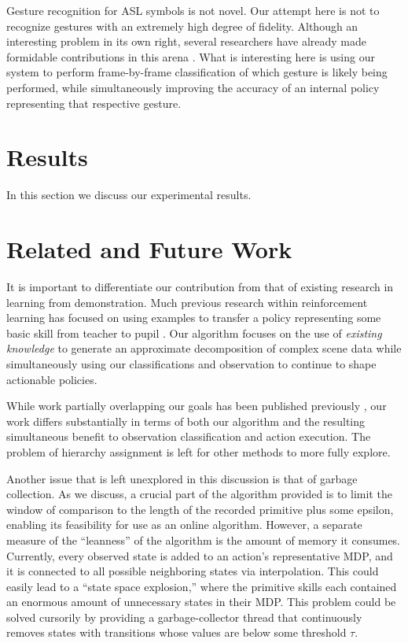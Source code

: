 \documentclass[letterpaper]{article}
\begin{document}
Gesture recognition for ASL symbols is not novel.  Our attempt here is not to recognize gestures with an extremely high degree of fidelity.  Although an interesting problem in its own right, several researchers have already made formidable contributions in this arena \cite{HandGestures,HSMMRecognition,POMDPGesture,HoughASL,ASLRealTime,MotionASL}.  What is interesting here is using our system to perform frame-by-frame classification of which gesture is likely being performed, while simultaneously improving the accuracy of an internal policy representing that respective gesture.

\section{Results}
\label{sec:result}
In this section we discuss our experimental results.

\section{Related and Future Work}
\label{sec:future}
It is important to differentiate our contribution from that of
existing research in learning from demonstration.  Much previous research
within reinforcement learning has focused on using examples to
transfer a policy representing some basic skill from teacher to
pupil \cite{JenkinsLFD,LFDSurvey}.  Our algorithm focuses on the use of
\textit{existing knowledge} to generate an approximate decomposition of
complex scene data while simultaneously using our classifications and 
observation to continue to shape actionable policies.

While work partially overlapping our goals has been published previously
\cite{LearningBehaviorFusion}, our work differs substantially in terms of both
our algorithm and the resulting simultaneous benefit to observation
classification and action execution. The problem of hierarchy assignment is
left for other methods to more fully explore.

Another issue that is left unexplored in this discussion is that of garbage collection.  As we discuss, a crucial part of the algorithm provided is to limit the window of comparison to the length of the recorded primitive plus some epsilon, enabling its feasibility for use as an online algorithm.  However, a separate measure of the ``leanness'' of the algorithm is the amount of memory it consumes.  Currently, every observed state is added to an action's representative MDP, and it is connected to all possible neighboring states via interpolation.  This could easily lead to a ``state space explosion,'' where the primitive skills each contained an enormous amount of unnecessary states in their MDP.  This problem could be solved cursorily by providing a garbage-collector thread that continuously removes states with transitions whose values are below some threshold $\tau$.
\end{document}
